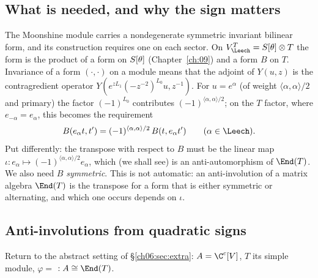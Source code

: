 \subsection{What is needed, and why the sign matters}

The Moonshine module carries a nondegenerate symmetric invariant bilinear form, and its
construction requires one on each sector.  On $V_\Leech^T=\chsixS\otimes T$ the form is the
product of a form on $S[\theta]$ (Chapter~\ref{ch:09}) and a form $B$ on $T$.  Invariance of a form
$(\cdot,\cdot)$ on a module means that the adjoint of $Y(u,z)$ is the contragredient operator
$Y(e^{zL_1}(-z^{-2})^{L_0}u,z^{-1})$.  For $u=e^\alpha$ (of weight $\langle\alpha,\alpha\rangle/2$
and primary) the factor $(-1)^{L_0}$ contributes $(-1)^{\langle\alpha,\alpha\rangle/2}$; on the $T$
factor, where $e_{-\alpha}=e_\alpha$, this becomes the requirement
\begin{equation}\label{ch06:eq:Tlaw}
  B(e_\alpha t,t')=(-1)^{\langle\alpha,\alpha\rangle/2}\,B(t,e_\alpha t')\qquad(\alpha\in\Leech).
\end{equation}
Put differently: the transpose with respect to $B$ must be the linear map
$\iota:e_\alpha\mapsto(-1)^{\langle\alpha,\alpha\rangle/2}e_\alpha$, which (we shall see) is an
anti-automorphism of $\End(T)$.  We also need $B$ \emph{symmetric}.  This is not automatic: an
anti-involution of a matrix algebra $\End(T)$ is the transpose for a form that is either symmetric
or alternating, and which one occurs depends on $\iota$.

\subsection{Anti-involutions from quadratic signs}

Return to the abstract setting of \S\ref{ch06:sec:extra}: $A=\C^c[V]$, $T$ its simple module,
$\varphi=$  $:A\cong\End(T)$.

